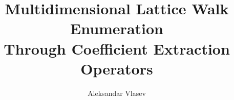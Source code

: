 \documentclass[gpscopy,onehalfspacing,11pt]{ubcdiss}
\title{Multidimensional Lattice Walk Enumeration \\Through Coefficient Extraction Operators}
\author{Aleksandar Vlasev}
\begin{document}


\maketitle


\cleardoublepage


\cleardoublepage

\tableofcontents
\cleardoublepage	%

\listoftables
\cleardoublepage	%

\listoffigures
\cleardoublepage	%



\textspacing		%




\mainmatter

\acresetall	%










\begin{singlespace}
\raggedright


\end{singlespace}

%

\end{document}
